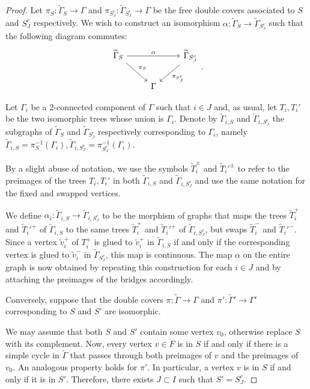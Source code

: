 \documentclass[11pt]{article}
\theoremstyle{definition}
\numberwithin{equation}{section}
\theoremstyle{definition}
\newcommand{\tGa}{\widetilde{\Gamma}}
\newcommand{\Ga}{\Gamma}
\newcommand{\wt}[1]{\widetilde{#1}}
\begin{document}
{    \begin{proof}
        Let $\pi_{S}\colon \tGa_S\to \Ga$ and $\pi_{S_J^c}\colon \tGa_{S_J^c}\to \Ga$ be the free double covers associated to $S$ and $S_J^c$ respectively. 
        We wish to construct an isomorphism $\alpha\colon  \tGa_S\to \tGa_{S_J^c}$ such that the following diagram commutes: 
        \[
\begin{tikzcd}
\tGa_S \arrow[rr, "\alpha"] \arrow[rd, "\pi_S"] &      & \tGa_{S_J^c} \arrow[ld, "\pi_{S_J^c}"] \\
                              & \Ga&                
\end{tikzcd}.
        \]

 Let $\Gamma_i$ be a 2-connected component of $\Gamma$ such that $i\in J$ and,  as usual, let $T_i,T_i'$ be the two  isomorphic trees whose union is $\Gamma_i$. Denote by $\wt\Gamma_{i,S}$ and $\wt\Gamma_{i,S_J^c}$ the subgraphs of $\wt\Gamma_S$ and $\wt\Gamma_{S_J^c}$ respectively corresponding to $\Gamma_i$, namely
 $\wt\Gamma_{i,S} = \pi_{S}^{-1}(\Gamma_i), \wt\Gamma_{i,S_J^c} = \pi_{S_J^c}^{-1}(\Gamma_i)$.
 
        By a slight abuse of notation, we use the  symbols $\wt T_i^{\pm}$ and $\wt T_i'^{\pm}$ to refer to the preimages of the trees $T_i, T_i'$
        in both
        $\wt\Gamma_{i,S}$ and $\wt\Gamma_{i,S_J^c}$ and use the same notation for the fixed and swapped vertices.  
    
        We define $\alpha_i:\wt\Gamma_{i,S}\to\wt\Gamma_{i,S_J^c}$  to be the morphism of graphs that maps the trees $\wt T_i^+$ and $\wt T_i'^+$ of $\wt\Gamma_{i,S}$ to the same trees $\wt T_i^+$ and $\wt T_i'^+$ of $\wt\Gamma_{i,S_J^c}$, but 
        swaps $\wt T_i^-$ and $\wt T_i'^-$.
        Since a vertex $\wt v_i^+$ of $T_i^+$ is glued to $\wt v_i^+$ in $\wt\Gamma_{i,S}$ if and only if 
        the corresponding vertex  is glued to $\wt v_i^-$ in  $\tGa_{S_J^c}$, this map is continuous. 
The map $\alpha$ on the entire graph is now obtained      by repeating this construction for each $i\in J$ and by attaching the preimages of the bridges accordingly. 
            
Conversely, suppose that the double covers $\pi:\wt\Gamma\to\Gamma$ and $\pi':\wt\Gamma'\to\Gamma'$ corresponding to $S$ and $S'$ are isomorphic.
 
We may assume that both $S$ and $S'$ contain some vertex $v_0$, otherwise replace $S$ with its complement.  Now,  every vertex $v\in F$ is  in $S$ if and only if there is a simple cycle in $\wt\Gamma$ that passes through both  preimages of $v$ and the preimages of $v_0$.  An analogous property holds for $\pi'$. In particular, a vertex $v$ is in $S$ if and only if it is in $S'$. 
Therefore, there exists $J\subset I$ such that $S'=S^c_{J}$.
    \end{proof}

}
\end{document}

